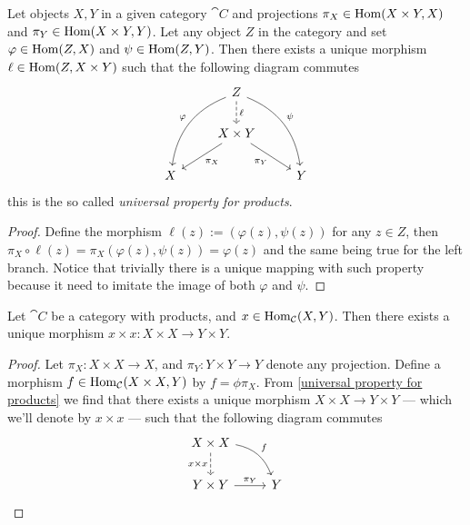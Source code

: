 \begin{proposition}\label{universal property for products}
   Let objects \(X, Y\) in a given category \(\cat{C}\) and projections \(\pi_X
   \in \operatorname{Hom}(X \times Y, X)\) and \(\pi_Y \in \operatorname{Hom}(X \times Y, Y)\). Let any
   object \(Z\) in the category and set \(\varphi \in \operatorname{Hom}(Z, X)\) and \(\psi
   \in \operatorname{Hom}(Z, Y)\). Then there exists a unique morphism \(\ell \in \operatorname{Hom}(Z, X
   \times Y)\) such that the following diagram commutes
   \[
      \begin{tikzcd}
          & Z
          \ar[d, dashed, "\ell"]
          \ar[ddl, bend right, swap, "\varphi"]
          \ar[ddr, bend left, "\psi"]
            & \\
          & X \times Y \ar[dl, "\pi_X"] \ar[dr, swap, "\pi_Y"] \\
        X
          &
            & Y
      \end{tikzcd}
   \]
   this is the so called \emph{universal property for products}.
\end{proposition}

\begin{proof}
   Define the morphism \(\ell(z) := (\varphi(z), \psi(z))\) for any  \(z \in
   Z\), then \(\pi_X \circ \ell (z) = \pi_X(\varphi(z), \psi(z)) = \varphi(z)\)
   and the same being true for the left branch. Notice that trivially there is a
   unique mapping with such property because it need to imitate the image of
   both \(\varphi\) and \(\psi\).
\end{proof}

\begin{proposition}\label{prop: product-morphism}
  Let \(\cat C\) be a category with products, and \(x \in \operatorname{Hom}_{\mathcal C}(X, Y)\).
  Then there exists a unique morphism \(x \times x: X \times X \to Y \times Y\).
\end{proposition}

\begin{proof}
  Let \(\pi_X: X \times X \to X\), and \(\pi_Y: Y \times Y \to Y\) denote any
  projection. Define a morphism \(f \in \operatorname{Hom}_{\mathcal C}(X \times X, Y)\) by \(f =
  \phi \pi_X\). From \cref{universal property for products} we find that there
  exists a unique morphism \(X \times X \to Y \times Y\) --- which we'll denote
  by \(x \times x\) --- such that the following diagram commutes
  \[
    \begin{tikzcd}
      X \times X \ar[d, dashed, swap, "x \times x"] \ar[dr, bend left, "f"] \\
      Y \times Y \ar[r, "\pi_Y"] &Y
    \end{tikzcd}
  \]
\end{proof}

